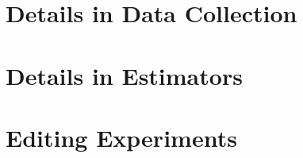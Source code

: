 \documentclass[11pt]{article}
\begin{document}



\clearpage
\appendix

\section{Details in Data Collection}\label{app:data-details}


\section{Details in Estimators}\label{app:exp-details}


\section{Editing Experiments}\label{sec:editing}

%


\end{document}
